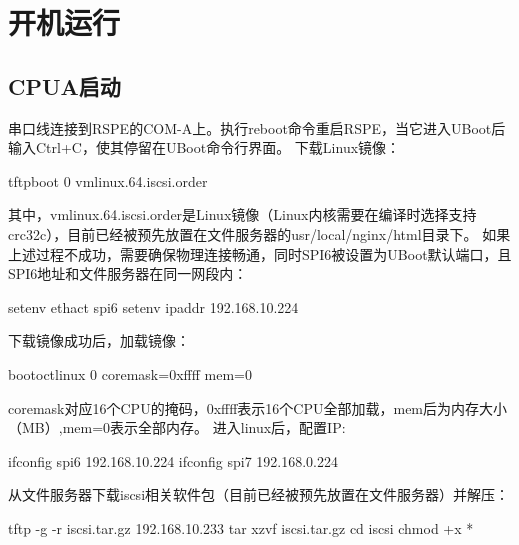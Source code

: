 \section{开机运行}
\subsection{CPUA启动}
串口线连接到RSPE的COM-A上。执行reboot命令重启RSPE，当它进入UBoot后输入Ctrl+C，使其停留在UBoot命令行界面。
下载Linux镜像：
\begin{shellcmd}
tftpboot 0 vmlinux.64.iscsi.order
\end{shellcmd}

其中，vmlinux.64.iscsi.order是Linux镜像（Linux内核需要在编译时选择支持crc32c），目前已经被预先放置在文件服务器的usr/local/nginx/html目录下。
如果上述过程不成功，需要确保物理连接畅通，同时SPI6被设置为UBoot默认端口，且SPI6地址和文件服务器在同一网段内：
\begin{shellcmd}
setenv ethact spi6
setenv ipaddr 192.168.10.224
\end{shellcmd}

下载镜像成功后，加载镜像：
\begin{shellcmd}
bootoctlinux 0 coremask=0xffff mem=0
\end{shellcmd}

coremask对应16个CPU的掩码，0xffff表示16个CPU全部加载，mem后为内存大小（MB）,mem=0表示全部内存。
进入linux后，配置IP:
\begin{shellcmd}
ifconfig spi6 192.168.10.224
ifconfig spi7 192.168.0.224
\end{shellcmd}

从文件服务器下载iscsi相关软件包（目前已经被预先放置在文件服务器）并解压：
\begin{shellcmd}
tftp -g -r iscsi.tar.gz 192.168.10.233
tar xzvf iscsi.tar.gz
cd iscsi
chmod +x *
\end{shellcmd}

